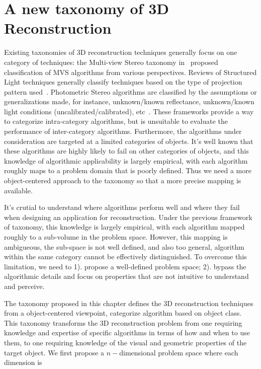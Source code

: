
\chapter{A new taxonomy of 3D Reconstruction}
\label{ch:3DRecon_Taxo}
Existing taxonomies of 3D reconstruction techniques generally focus on one category of techniques: the Multi-view Stereo taxonomy in~\cite{seitz2006comparison} proposed classification of MVS algorithms from various perspectives. Reviews of Structured Light techniques generally classify techniques based on the type of projection pattern used~\cite{geng2011structured, salvi2004pattern}. Photometric Stereo algorithms are classified by the assumptions or generalizations made, for instance, unknown/known reflectance, unknown/known light conditions (uncalibrated/calibrated), etc~\cite{shi2016benchmark}. These frameworks provide a way to categorize intra-category algorithms, but is unsuitable to evaluate the performance of inter-category algorithms. Furthermore, the algorithms under consideration are targeted at a limited categories of objects. It's well known that these algorithms are highly likely to fail on other categories of objects, and this knowledge of algorithmic applicability is largely empirical, with each algorithm roughly maps to a problem domain that is poorly defined. Thus we need a more object-centered approach to the taxonomy so that a more precise mapping is available.

It's crutial to understand where algorithms perform well and where they fail when designing an application for reconstruction. Under the previous framework of taxonomy, this knowledge is largely empirical, with each algorithm mapped roughly to a sub-volume in the problem space. However, this mapping is ambigueous, \ie the sub-space is not well defined, and also too general, \ie algorithm within the same category cannot be effectively distinguished. To overcome this limitation, we need to 1). propose a well-defined problem space; 2). bypass the algorithmic details and focus on properties that are not intuitive to understand and perceive.

The taxonomy proposed in this chapter defines the 3D reconstruction techniques from a object-centered viewpoint, \ie categorize algorithm based on object class. This taxonomy transforms the 3D reconstruction problem from one requiring knowledge and expertise of specific algorithms in terms of how and when to use them, to one requiring knowledge of the visual and geometric properties of the target object. We first propose a $n-$dimensional problem space where each dimension is 

